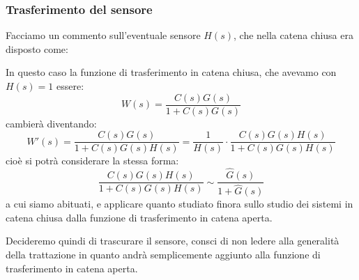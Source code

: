 \documentclass[a4paper,11pt]{article}
\begin{document}
\subsubsection{Trasferimento del sensore}
Facciamo un commento sull'eventuale sensore $H(s)$, che nella catena chiusa era disposto come:

\begin{center}
\end{center}

In questo caso la funzione di trasferimento in catena chiusa, che avevamo con $H(s) = 1$ essere:
$$
W(s) = \frac{C(s) G(s)}{1 + C(s) G(s)}
$$
cambierà diventando:
$$
W'(s) = \frac{C(s) G(s)}{1 + C(s) G(s) H(s)} = \frac{1}{H(s)} \cdot \frac{C(s) G(s) H(s)}{1 + C(s) G(s) H(s)}
$$
cioè si potrà considerare la stessa forma:
$$
\frac{C(s) G(s) H(s)}{1 + C(s) G(s) H(s)} \sim \frac{\hat{G}(s)}{1 + \hat{G}(s)}
$$
a cui siamo abituati, e applicare quanto studiato finora sullo studio dei sistemi in catena chiusa dalla funzione di trasferimento in catena aperta.

Decideremo quindi di trascurare il sensore, consci di non ledere alla generalità della trattazione in quanto andrà semplicemente aggiunto alla funzione di trasferimento in catena aperta.
\end{document}
